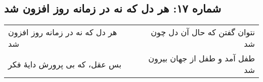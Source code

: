 \begin{center}
\section*{شماره ۱۷: هر دل که نه در زمانه روز افزون شد}
\label{sec:017}
\begin{longtable}{l p{0.5cm} r}
هر دل که نه در زمانه روز افزون شد
&&
نتوان گفتن که حال آن دل چون شد
\\
بس عقل، که بی پرورش دایهٔ فکر
&&
طفل آمد و طفل از جهان بیرون شد
\\
\end{longtable}
\end{center}
